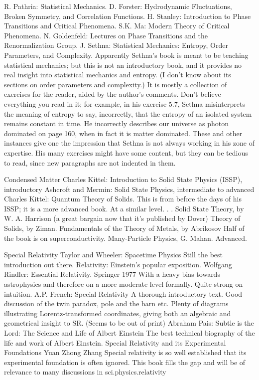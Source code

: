 \documentclass[10pt,a4paper]{book}
\theoremstyle{definition}
\begin{document}
R. Pathria: Statistical Mechanics.
D. Forster: Hydrodynamic Fluctuations, Broken Symmetry, and Correlation Functions.
H. Stanley: Introduction to Phase Transitions and Critical Phenomena.
S.K. Ma: Modern Theory of Critical Phenomena.
N. Goldenfeld: Lectures on Phase Transitions and the Renormalization Group.
J. Sethna: Statistical Mechanics: Entropy, Order Parameters, and Complexity.
Apparently Sethna's book is meant to be teaching statistical mechanics; but this is not an introductory book, and it provides no real insight into statistical mechanics and entropy.  (I don't know about its sections on order parameters and complexity.)  It is mostly a collection of exercises for the reader, aided by the author's comments.  Don't believe everything you read in it; for example, in his exercise 5.7, Sethna misinterprets the meaning of entropy to say, incorrectly, that the entropy of an isolated system remains constant in time.  He incorrectly describes our universe as photon dominated on page 160, when in fact it is matter dominated.  These and other instances give one the impression that Sethna is not always working in his zone of expertise.  His many exercises might have some content, but they can be tedious to read, since new paragraphs are not indented in them.



Condensed Matter
Charles Kittel: Introduction to Solid State Physics (ISSP),
introductory
Ashcroft and Mermin: Solid State Physics,
intermediate to advanced
Charles Kittel: Quantum Theory of Solids.
This is from before the days of his ISSP; it is a more advanced book.  At a similar level. . .
Solid State Theory, by W. A. Harrison
(a great bargain now that it's published by Dover)
Theory of Solids, by Ziman.
Fundamentals of the Theory of Metals, by Abrikosov
Half of the book is on superconductivity.
Many-Particle Physics, G. Mahan.
Advanced.



Special Relativity
Taylor and Wheeler: Spacetime Physics Still the best introduction out there.
Relativity: Einstein's popular exposition.
Wolfgang Rindler: Essential Relativity.  Springer 1977
With a heavy bias towards astrophysics and therefore on a more moderate level formally.  Quite strong on intuition.
A.P. French: Special Relativity
A thorough introductory text.  Good discussion of the twin paradox, pole and the barn etc.  Plenty of diagrams illustrating Lorentz-transformed coordinates, giving both an algebraic and geometrical insight to SR.  (Seems to be out of print)
Abraham Pais: Subtle is the Lord: The Science and Life of Albert Einstein
The best technical biography of the life and work of Albert Einstein.
Special Relativity and its Experimental Foundations Yuan Zhong Zhang
Special relativity is so well established that its experimental foundation is often ignored.  This book fills the gap and will be of relevance to many discussions in sci.physics.relativity
\end{document}
